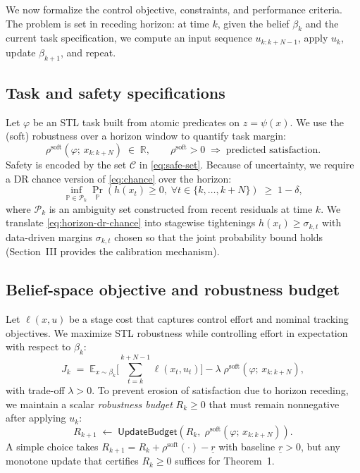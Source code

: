 \documentclass[journal]{IEEEtran}
\theoremstyle{definition}
\begin{document}
We now formalize the control objective, constraints, and performance criteria. The problem is set
in receding horizon: at time $k$, given the belief $\beta_k$ and the current task specification,
we compute an input sequence $u_{k:k+N-1}$, apply $u_k$, update $\beta_{k+1}$, and repeat.

\subsection{Task and safety specifications}
Let $\varphi$ be an STL task built from atomic predicates on $z=\psi(x)$. We use the (soft)
robustness over a horizon window to quantify task margin:
\begin{equation}
  \rho^{\text{soft}}(\varphi;\, x_{k:k+N}) \;\in\; \mathbb{R},
  \qquad
  \rho^{\text{soft}}>0 \;\Rightarrow\; \text{predicted satisfaction.}
  \label{eq:robustness-soft}
\end{equation}
Safety is encoded by the set $\mathcal{C}$ in \eqref{eq:safe-set}. Because of uncertainty, we
require a DR chance version of \eqref{eq:chance} over the horizon:
\begin{equation}
  \inf_{\mathbb{P}\in\mathcal{P}_k}
  \Pr_{\mathbb{P}}\!\left(h(x_t)\ge 0,\; \forall t\in\{k,\dots,k+N\}\right)
  \;\ge\; 1-\delta,
  \label{eq:horizon-dr-chance}
\end{equation}
where $\mathcal{P}_k$ is an ambiguity set constructed from recent residuals at time $k$.
We translate \eqref{eq:horizon-dr-chance} into stagewise tightenings
$h(x_t)\ge \sigma_{k,t}$ with data-driven margins $\sigma_{k,t}$ chosen so that the joint
probability bound holds (Section~III provides the calibration mechanism).

\subsection{Belief-space objective and robustness budget}
Let $\ell(x,u)$ be a stage cost that captures control effort and nominal tracking objectives.
We maximize STL robustness while controlling effort in expectation with respect to $\beta_k$:
\begin{equation}
  J_{k} \;=\; \mathbb{E}_{x\sim\beta_k}\Bigg[
    \sum_{t=k}^{k+N-1} \ell(x_t,u_t)
  \Bigg]
  - \lambda \; \rho^{\text{soft}}(\varphi;\, x_{k:k+N}),
  \label{eq:belief-objective}
\end{equation}
with trade-off $\lambda>0$. To prevent erosion of satisfaction due to horizon receding, we maintain
a scalar \emph{robustness budget} $R_k\ge 0$ that must remain nonnegative after applying $u_k$:
\begin{equation}
  R_{k+1} \;\leftarrow\; \mathsf{UpdateBudget}(R_k,\; \rho^{\text{soft}}(\varphi;\, x_{k:k+N})).
  \label{eq:budget}
\end{equation}
A simple choice takes $R_{k+1}=R_k+\rho^{\text{soft}}(\cdot)-\underline{r}$ with baseline
$\underline{r}>0$, but any monotone update that certifies $R_k\ge 0$ suffices for Theorem~1.
\end{document}
